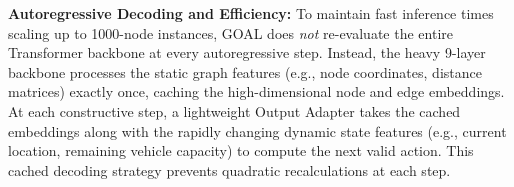 \vspace{0.5em}
\noindent \textbf{Autoregressive Decoding and Efficiency:} To maintain fast inference times scaling up to 1000-node instances, GOAL does \textit{not} re-evaluate the entire Transformer backbone at every autoregressive step. Instead, the heavy 9-layer backbone processes the static graph features (e.g., node coordinates, distance matrices) exactly once, caching the high-dimensional node and edge embeddings. At each constructive step, a lightweight Output Adapter takes the cached embeddings along with the rapidly changing dynamic state features (e.g., current location, remaining vehicle capacity) to compute the next valid action. This cached decoding strategy prevents quadratic recalculations at each step.